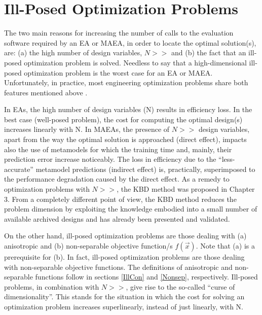 



 

\section{Ill-Posed Optimization Problems}
\label{illpost}
The two main reasons for increasing the number of calls to the evaluation software  required by an EA or MAEA, in order to locate the optimal solution(s), are: (a) the high number of design variables, $N\!>>$ and (b) the fact that an ill-posed optimization problem is solved. Needless to say that a high-dimensional ill-posed optimization problem is the worst case for an EA or MAEA.  Unfortunately, in practice, most engineering optimization problems share both features mentioned above . 

In EAs, the high number of design variables (N) results in efficiency loss. In the best case (well-posed problem), the cost for computing the optimal design(s) increases linearly with N. In MAEAs, the presence of $N\!>>$ design variables, apart from the way the optimal solution is approached (direct effect), impacts also the use of metamodels for which the training time and, mainly, their  prediction error increase noticeably. The loss in efficiency due to the ``less-accurate'' metamodel predictions (indirect effect) is, practically, superimposed to the performance degradation caused by the direct effect.  As a remedy to optimization problems with $N\!>>$, the KBD method was proposed in Chapter 3. From a completely different point of view, the KBD method reduces the problem dimension by exploiting the knowledge embodied into a small number of available archived designs and has already been presented and validated.             

On the other hand, ill-posed optimization problems are those dealing with (a) anisotropic and (b)  non-separable objective function/s $f(\vec{x})$. Note that (a) is a prerequisite for (b). In fact, ill-posed optimization problems are those dealing with non-separable objective functions. The definitions of anisotropic and non-separable functions follow in sections \ref{IllCon} and \ref{Nonsep}, respectively. Ill-posed problems, in combination with $N\!>>$, give rise to the so-called ``curse of dimensionality''. This stands for the situation in which the cost for solving an optimization problem increases superlinearly, instead of just linearly, with N. 

